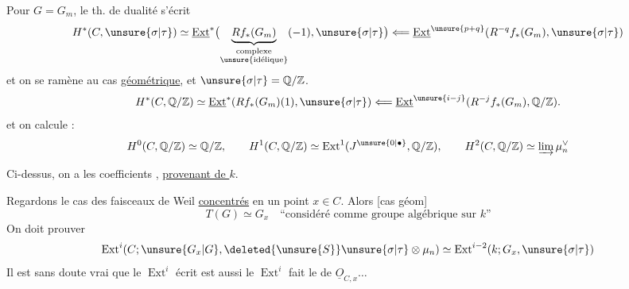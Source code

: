 Pour $G=G_m$, le th. de dualité s'écrit 
\[
H^*(C,\unsure{\sigma|\tau})\simeq
\underline{\operatorname{Ext}}^*\bigl(\underbrace{Rf_*(G_m)}_{\substack{\text{complexe}\\\text{\unsure{idélique}}}}(-1),\unsure{\sigma|\tau}\bigr)
\Longleftarrow\underline{\operatorname{Ext}}^{\unsure{p+q}}(R^{-q}f_*(G_m),\unsure{\sigma|\tau})
\]
et on se ramène au cas \uline{géométrique}, et $\unsure{\sigma|\tau}=\mathbb Q/\mathbb Z$.
\[
H^*(C,\mathbb Q/\mathbb Z)\simeq\underline{\operatorname{Ext}}^*(Rf_*(G_m)(1),\unsure{\sigma|\tau})
\Longleftarrow\underline{\operatorname{Ext}}^{\unsure{i-j}}(R^{-j}f_*(G_m),\mathbb Q/\mathbb Z).
\]
et on calcule :
\[
H^0(C,\mathbb Q/\mathbb Z)\simeq\mathbb Q/\mathbb Z,\qquad
H^1(C,\mathbb Q/\mathbb Z)\simeq\operatorname{Ext}^1(J^{\unsure{0|\bullet}},\mathbb Q/\mathbb Z),\qquad
H^2(C,\mathbb Q/\mathbb Z)\simeq\varinjlim\mu_n^\vee
\]


Ci-dessus, on a  les coefficients  , \uline{provenant de $k$}.

Regardons le cas des faisceaux de Weil \uline{concentrés} en un point $x\in C$. Alors  [cas géom]
\[
T(G)\simeq G_x\quad\text{``considéré comme groupe algébrique sur $k$''}
\]
On doit prouver
\[
\operatorname{Ext}^i(C;\unsure{G_x|G},\deleted{\unsure{S}}\unsure{\sigma|\tau}\otimes\mu_n)\simeq
\operatorname{Ext}^{i-2}(k;G_x,\unsure{\sigma|\tau})
\]
Il est sans doute vrai que le $\operatorname{Ext}^i$ écrit est aussi le $\operatorname{Ext}^i$  fait  le  de $\underline O_{C,x}\ldots$

